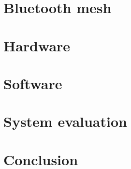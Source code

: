 \documentclass[10pt]{beamer}
\begin{document}
\section{Bluetooth mesh}

\section{Hardware}

\section{Software}

\section{System evaluation}

\section{Conclusion}
\end{document}
